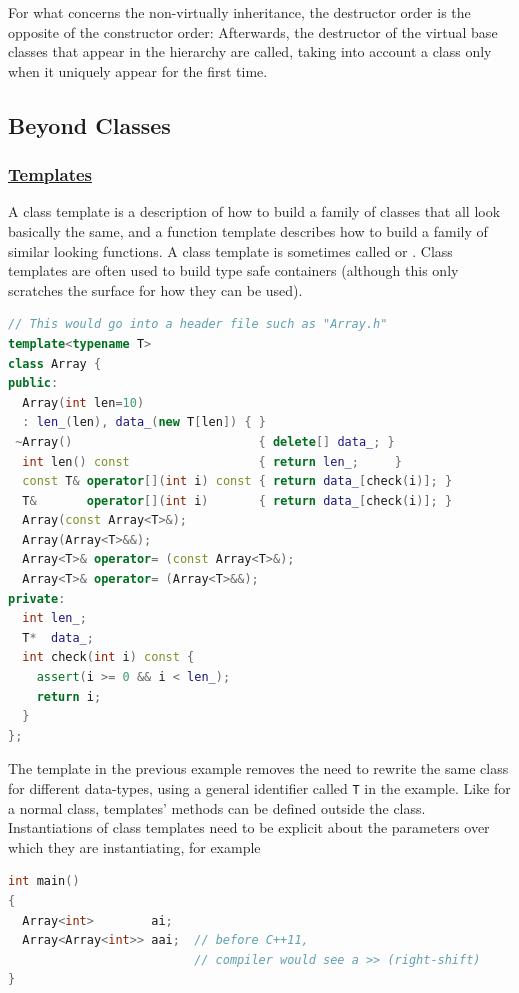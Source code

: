 For what concerns the non-virtually inheritance, the destructor order 
is the opposite of the constructor order:
\newline
{}
\newline
Afterwards, the destructor of the virtual base classes that appear in 
the hierarchy are called, taking into account a class only when it uniquely 
appear for the first time.
\newpage


\subsection{Beyond Classes}
\subsubsection{\href{https://isocpp.org/wiki/faq/templates}{Templates}}

A class template is a description of how to build a family of classes 
that all look basically the same, and a function template describes how 
to build a family of similar looking functions.
\newline
A class template is sometimes called  or 
.
\newline
Class templates are often used to build type safe containers 
(although this only scratches the surface for how they can be used).

\begin{lstlisting}[language=C++]
// This would go into a header file such as "Array.h"
template<typename T>
class Array {
public:
  Array(int len=10)                
  : len_(len), data_(new T[len]) { }
 ~Array()                          { delete[] data_; }
  int len() const                  { return len_;     }
  const T& operator[](int i) const { return data_[check(i)]; }
  T&       operator[](int i)       { return data_[check(i)]; }
  Array(const Array<T>&);
  Array(Array<T>&&);
  Array<T>& operator= (const Array<T>&);
  Array<T>& operator= (Array<T>&&);
private:
  int len_;
  T*  data_;
  int check(int i) const {
    assert(i >= 0 && i < len_);
    return i;
  }
};
\end{lstlisting}
The template in the previous example removes the need to rewrite the 
same class for different data-types, using a general identifier called 
\texttt{T} in the example.
\newline
Like for a normal class, templates' methods can be defined outside the 
class.
\newline
Instantiations of class templates need to be explicit about the parameters 
over which they are instantiating, for example
\begin{lstlisting}[language=C++]
int main()
{
  Array<int>        ai;
  Array<Array<int>> aai;  // before C++11, 
                          // compiler would see a >> (right-shift)
}
\end{lstlisting}

